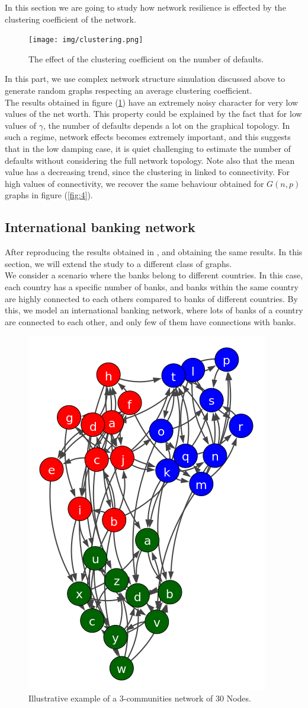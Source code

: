 \documentclass[14pt]{article}
\providecommand{\reff}[1]{(\ref{#1})}
\begin{document}
In this section we are going to study how network resilience is effected by the clustering coefficient of the network.
\begin{figure}[H]
    \centering
  \texttt{[image: img/clustering.png]}
  \caption{The effect of the clustering coefficient on the number of defaults.}
  \label{fig:clust}
\end{figure}
In this part, we use complex network structure simulation discussed above to generate random graphs respecting an average clustering coefficient. 
\\ The results obtained in figure \reff{fig:clust} have an extremely noisy character for very low values of the net worth. This property could be explained by the fact that for low values of $\gamma$, the number of defaults depends a lot on the graphical topology. In such a regime, network effects becomes extremely important, and this suggests that in the low damping case, it is quiet challenging to  estimate the number of defaults without considering the full network topology. Note also that the mean value has a decreasing trend, since the clustering in linked to connectivity. For high values of connectivity, we recover the same behaviour obtained for $G(n,p)$ graphs in figure \reff{fig:4}.

\subsection{International banking network}
After reproducing the results obtained in \cite{art1}, and obtaining the same results. In this section, we will extend the study to a different class of graphs.
\\We consider a scenario where the banks belong to different countries. In this case, each country has a specific number of banks, and banks within the same country are highly connected to each others compared to banks of different countries. By this, we model an international banking network, where lots of banks of a country are connected to each other, and only few of them have connections with  banks.
\begin{figure}[H]
    \centering
  \includegraphics[width=0.35\linewidth]{img/fig6.png}
  \caption{Illustrative example of a $3$-communities network of $30$ Nodes.}
  \label{fig:6}
\end{figure}
\end{document}
